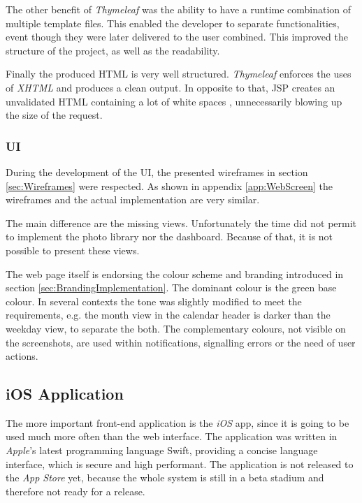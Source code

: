 The other benefit of \emph{Thymeleaf} was the ability to have a runtime combination of multiple template files. This enabled the developer to separate functionalities, event though they were later delivered to the user combined. This improved the structure of the project, as well as the readability.

Finally the produced \gls{HTML} is very well structured. \emph{Thymeleaf} enforces the uses of \emph{XHTML} and produces a clean output. In opposite to that, \gls{JSP} creates an unvalidated \gls{HTML} containing a lot of white spaces , unnecessarily blowing up the size of the request.

\subsubsection{UI}

During the development of the \gls{UI}, the presented wireframes in section \vref{sec:Wireframes} were respected. As shown in appendix \vref{app:WebScreen} the wireframes and the actual implementation are very similar. 

The main difference are the missing views. Unfortunately the time did not permit to implement the photo library nor the dashboard. Because of that, it is not possible to present these views.

The web page itself is endorsing the colour scheme and branding introduced in section \vref{sec:BrandingImplementation}. The dominant colour is the green base colour. In several contexts the tone was slightly modified to meet the requirements, e.g. the month view in the calendar header is darker than the weekday view, to separate the both. The complementary colours, not visible on the screenshots, are used within notifications, signalling errors or the need of user actions.

\subsection{iOS Application}

The more important front-end application is the \emph{iOS} app, since it is going to be used much more often than the web interface. The application was written in \emph{Apple}'s latest programming language \gls{Swift}, providing a concise language interface, which is secure and high performant. The application is not released to the \emph{App Store} yet, because the whole system is still in a beta stadium and therefore not ready for a release.

